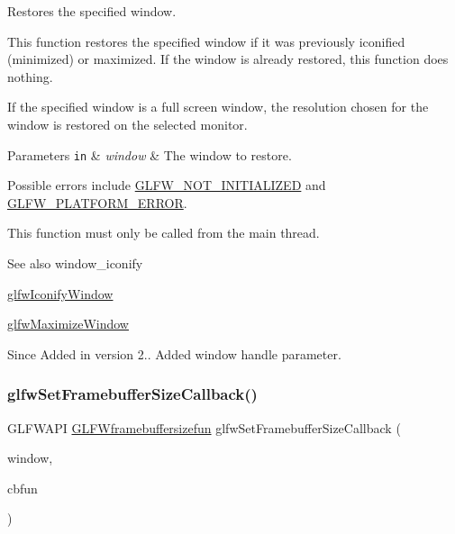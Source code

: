 Restores the specified window. 

This function restores the specified window if it was previously iconified (minimized) or maximized. If the window is already restored, this function does nothing.

If the specified window is a full screen window, the resolution chosen for the window is restored on the selected monitor.


\begin{DoxyParams}[1]{Parameters}
\mbox{\tt in}  & {\em window} & The window to restore.\\
\hline
\end{DoxyParams}
Possible errors include \hyperlink{group__errors_ga2374ee02c177f12e1fa76ff3ed15e14a}{G\+L\+F\+W\+\_\+\+N\+O\+T\+\_\+\+I\+N\+I\+T\+I\+A\+L\+I\+Z\+ED} and \hyperlink{group__errors_gad44162d78100ea5e87cdd38426b8c7a1}{G\+L\+F\+W\+\_\+\+P\+L\+A\+T\+F\+O\+R\+M\+\_\+\+E\+R\+R\+OR}.

This function must only be called from the main thread.

\begin{DoxySeeAlso}{See also}
window\+\_\+iconify 

\hyperlink{group__window_ga24274e3c6ecd44e11fec5e6b66e4d7f3}{glfw\+Iconify\+Window} 

\hyperlink{group__window_ga4f825a55367d3fabde3d06e7f30128e8}{glfw\+Maximize\+Window}
\end{DoxySeeAlso}
\begin{DoxySince}{Since}
Added in version 2..  Added window handle parameter. 
\end{DoxySince}
\mbox{\label{group__window_gad766bcdb4465f9c6c62e5d8ca7cfba56}} 
\subsubsection{\texorpdfstring{glfw\+Set\+Framebuffer\+Size\+Callback()}{glfwSetFramebufferSizeCallback()}}
{\footnotesize\ttfamily G\+L\+F\+W\+A\+PI \hyperlink{group__window_ga3e218ef9ff826129c55a7d5f6971a285}{G\+L\+F\+Wframebuffersizefun} glfw\+Set\+Framebuffer\+Size\+Callback (\begin{DoxyParamCaption}\item[{\hyperlink{group__window_ga3c96d80d363e67d13a41b5d1821f3242}{G\+L\+F\+Wwindow} $\ast$}]{window,  }\item[{\hyperlink{group__window_ga3e218ef9ff826129c55a7d5f6971a285}{G\+L\+F\+Wframebuffersizefun}}]{cbfun }\end{DoxyParamCaption})}



